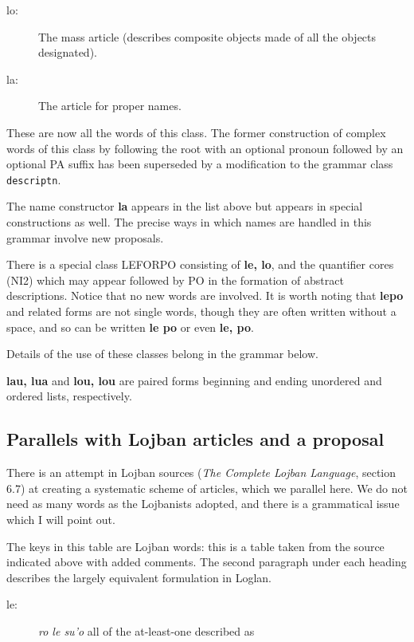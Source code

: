 \documentclass[12pt]{book}
\begin{document}
{\begin{description}
\item[lo:]  The mass article (describes composite objects made of all the objects designated).

\item[la:]   The article for proper names.
\end{description}


These are now all the words of this class.  The former construction of complex words of this class
by following the root with an optional pronoun followed by an optional PA suffix has been superseded by a modification to the grammar class {\tt descriptn}.

The name constructor {\bf la} appears in the list above but appears in special constructions as well.   The precise ways in which names are handled in this grammar involve new proposals.

There is a special class LEFORPO consisting of {\bf le, lo}, and the quantifier cores (NI2) which may appear
followed by PO in the formation of abstract descriptions.   Notice that no new words are involved.  It is worth noting that {\bf lepo} and related forms are
not single words, though they are often written without a space, and so can be written {\bf le po} or even {\bf le, po}.

Details of the use of these classes belong in the grammar below.

{\bf lau, lua} and {\bf lou, lou} are paired forms beginning and ending unordered and ordered lists, respectively. 

\subsection{Parallels with Lojban articles and a proposal}

There is an attempt in Lojban sources ({\em The Complete Lojban Language\/}, section 6.7)  at creating a systematic scheme of articles, which we parallel here.  We do not need as many words as the Lojbanists adopted, and there is a grammatical issue which I will point out.

The keys in this table are Lojban words:  this is a table taken from the source indicated above with added comments.  The second paragraph under each heading describes the largely equivalent formulation in Loglan.  

\begin{description}
\item[le: ]	{\em ro le su'o \/}	all of the at-least-one described as


\end{description}}
\end{document}
